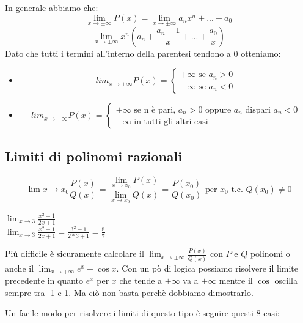 In generale abbiamo che:
\begin{equation*}
    \lim_{x\to\pm\infty}P(x)=\lim_{x\to\pm\infty}a_nx^n+...+a_0
\end{equation*}
\begin{equation*}
    \lim_{x\to\pm\infty}x^n(a_n+\frac{a_n-1}{x}+...+\frac{a_0}{x})
\end{equation*}
Dato che tutti i termini all'interno della parentesi tendono a 0 otteniamo:
\begin{itemize}
    \item $$lim_{x\to+\infty}P(x)=
    \begin{cases}
        +\infty \text{ se } a_n>0\\
        -\infty \text{ se } a_n<0
    \end{cases} 
    $$
    \item $$lim_{x\to-\infty}P(x)=
    \begin{cases}
        +\infty \text{ se n è pari, } a_n>0 \text{ oppure } a_n \text{ dispari } a_n<0\\
        -\infty \text{ in tutti gli altri casi }
    \end{cases} 
    $$
\end{itemize}

\subsection*{Limiti di polinomi razionali}
\begin{equation}
    \lim{x\to x_0}\frac{P(x)}{Q(x)}=\frac{\lim_{x\to x_0}P(x)}{\lim_{x\to x_0}Q(x)}=\frac{P(x_0)}{Q(x_0)} \text{ per } x_0 \text{ t.c. } Q(x_0)\neq 0
\end{equation}

\begin{example}
    $\lim_{x\to 3}\frac{x^2-1}{2x+1}$\\$\lim_{x\to 3}\frac{x^2-1}{2x+1}=\frac{3^2-1}{2*3+1}=\frac{8}{7}$
\end{example}

Più difficile è sicuramente calcolare il $\lim_{x\to\pm\infty}\frac{P(x)}{Q(x)}$ con $P$ e $Q$ polinomi o anche il $\lim_{x\to+\infty}e^x+\cos x$.
Con un pò di logica possiamo risolvere il limite precedente in quanto $e^x$ per $x$ che tende a $+\infty$ va a $+\infty$ mentre il $\cos$ oscilla sempre tra -1 e 1.
Ma ciò non basta perchè dobbiamo dimostrarlo.

Un facile modo per risolvere i limiti di questo tipo è seguire questi 8 casi:

